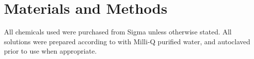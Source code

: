 \chapter{Materials and Methods}
\label{ch:methods}


  All chemicals used were purchased from Sigma unless otherwise stated. All
  solutions were prepared according to  with Milli-Q
  purified water, and autoclaved prior to use when appropriate.


